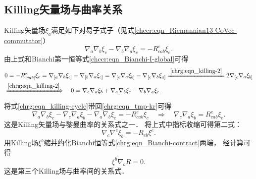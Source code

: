 \subsection{Killing矢量场与曲率关系}
Killing矢量场$\xi_a$满足如下对易子式子（见式\eqref{chccr:eqn_Riemannian13-CoVec-commutator}）
\begin{equation}\label{chrg:eqn_tmp-kr}
    {\nabla_a}{\nabla_b}{\xi_c} - {\nabla_b}{\nabla_a}{\xi_c} = -R_{cab}^e{\xi_e}.
\end{equation}
由上式和Bianchi第一恒等式\eqref{chccr:eqn_Bianchi-I-global}可得
\begin{align}
    &0=-R_{[cab]}^{e}{\xi_e}= {\nabla_{[a}}{\nabla_b}{\xi_{c]}} - {\nabla_{[b}}{\nabla_a}{\xi_{c]}}
    = {\nabla_{[c}}{\nabla_a}{\xi_{b]}} - {\nabla_{[c}}{\nabla_b}{\xi_{a]}}
    \xlongequal{\ref{chrg:eqn_killing-2}} 2 {\nabla_{[c}}{\nabla_a}{\xi_{b]}} \notag \\
    &\xRightarrow{\ref{chrg:eqn_killing-2}} \quad
    0= {\nabla_{c}}{\nabla_a}{\xi_{b}} + {\nabla_{a}}{\nabla_b}{\xi_{c}} -
    {\nabla_{b}}{\nabla_a}{\xi_{c}} . \label{chrg:eqn_killing-cycle}
\end{align}
将式\eqref{chrg:eqn_killing-cycle}带回\eqref{chrg:eqn_tmp-kr}可得
\begin{equation}\label{chrg:eqn_killing-Riemann-1}
    {\nabla_a}{\nabla_b}{\xi_c} -   {\nabla_{c}}{\nabla_a}{\xi_{b}}
    - {\nabla_{a}}{\nabla_b}{\xi_{c}} = -R_{cab}^e{\xi_e} \quad \Rightarrow \quad
    {\nabla_c}{\nabla_a}{\xi_b} = R_{cab}^e{\xi_e}.
\end{equation}
这是Killing矢量场与黎曼曲率的关系式之一．
将上式中指标收缩可得第二式：
\begin{equation}\label{chrg:eqn_killing-Riemann-2}
    {\nabla_c}{\nabla^c}{\xi_b} = -R_{eb}{\xi^e}.
\end{equation}
用Killing场$\xi^b$缩并约化Bianchi恒等式\eqref{chrg:eqn_Bianchi-contract}两端，
经计算可得
\begin{equation}\label{chrg:eqn_killing-Riemann-3}
    \xi^b\nabla_b R= 0 .
\end{equation}
这是第三个Killing场与曲率间的关系式．

